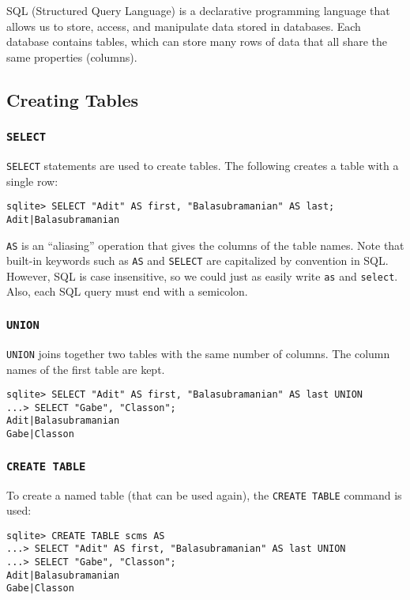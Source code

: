 SQL (Structured Query Language) is a declarative programming language that allows us to store, access, and manipulate data stored in databases.
Each database contains tables, which can store many rows of data that all share the same properties (columns). 


\subsection{Creating Tables}
\subsubsection{\lstinline{SELECT}}
\lstinline{SELECT} statements are used to create tables. The following creates a table with a single row: 
\begin{lstlisting}
sqlite> SELECT "Adit" AS first, "Balasubramanian" AS last;
Adit|Balasubramanian    
\end{lstlisting}

\lstinline{AS} is an ``aliasing'' operation that gives the columns of the table names. Note that built-in keywords such as \lstinline{AS} and \lstinline{SELECT} are capitalized by convention in SQL. However, SQL is case insensitive, so we could just as easily write \lstinline{as} and \lstinline{select}. Also, each SQL query must end with a semicolon. 

\subsubsection{\lstinline{UNION}}
\lstinline{UNION} joins together two tables with the same number of columns. The column names of the first table are kept. 

\begin{lstlisting}
sqlite> SELECT "Adit" AS first, "Balasubramanian" AS last UNION
...> SELECT "Gabe", "Classon";
Adit|Balasubramanian
Gabe|Classon
\end{lstlisting}

\subsubsection{\lstinline{CREATE TABLE}}
To create a named table (that can be used again), the \lstinline{CREATE TABLE} command is used: 
\begin{lstlisting}
sqlite> CREATE TABLE scms AS 
...> SELECT "Adit" AS first, "Balasubramanian" AS last UNION
...> SELECT "Gabe", "Classon";
Adit|Balasubramanian
Gabe|Classon
\end{lstlisting}

